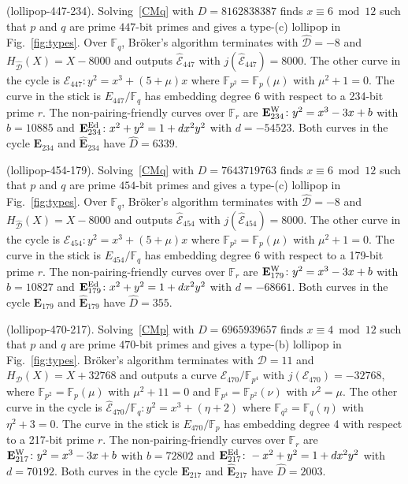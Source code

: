 \documentclass[version=preprint]{iacrcc}
\newcommand{\F}{\mathbb{F}}
\newcommand{\EC}{\mathcal{E}}
\newcommand{\D}{\mathcal{D}}
\begin{document}
\begin{example}(\textsf{lollipop-447-234}). \label{example:447-234} Solving~\eqref{CMq} with $D=8162838387$ finds $x \equiv 6 \bmod{12}$ such that $p$ and $q$ are prime $447$-bit primes and gives a type-(c) lollipop in Fig.~\ref{fig:types}. Over $\F_q$, Br{\"o}ker's algorithm terminates with $\hat{\D}=-8$ and $H_{\hat{\D}}(X)= X -8000$ and outputs $\hat{\EC}_{447}$ with $j(\hat{\EC}_{447}) =8000$. The other curve in the cycle is ${\EC}_{447} \colon y^2=x^3+(5+\mu)x$  where $\F_{p^2}=\F_p(\mu)$ with $\mu^2+1=0$.  The curve in the stick is $E_{447}/\F_q$ has embedding degree 6 with respect to a 234-bit prime $r$. The non-pairing-friendly curves over $\F_r$ are $\mathbf{E}_{234}^{\rm W} \colon y^2=x^3-3x+b$ with $b=10885$ and $\mathbf{E}_{234}^{\rm Ed} \colon x^2+y^2=1+dx^2y^2$ with $d=-54523$. Both curves in the cycle $\mathbf{E}_{234}$ and $\hat{\mathbf{E}}_{234}$ have $\hat{D}=6339$. 
\end{example}

\begin{example}(\textsf{lollipop-454-179}). \label{example:454-179} Solving~\eqref{CMq} with $D=7643719763$ finds $x \equiv 6 \bmod{12}$ such that $p$ and $q$ are prime $454$-bit primes and gives a type-(c) lollipop in Fig.~\ref{fig:types}. Over $\F_q$, Br{\"o}ker's algorithm terminates with $\hat{\D}=-8$ and $H_{\hat{\D}}(X)= X-8000$ and outputs $\hat{\EC}_{454}$ with $j(\hat{\EC}_{454}) =8000$. The other curve in the cycle is ${\EC}_{454} \colon y^2=x^3+(5+\mu)x$  where $\F_{p^2}=\F_p(\mu)$ with $\mu^2+1=0$.  The curve in the stick is $E_{454}/\F_q$ has embedding degree 6 with respect to a 179-bit prime $r$. The non-pairing-friendly curves over $\F_r$ are $\mathbf{E}_{179}^{\rm W} \colon y^2=x^3-3x+b$ with $b=10827$ and $\mathbf{E}_{179}^{\rm Ed} \colon x^2+y^2=1+dx^2y^2$ with $d=-68661$. Both curves in the cycle $\mathbf{E}_{179}$ and $\hat{\mathbf{E}}_{179}$ have $\hat{D}=355$. 
\end{example}

\begin{example}(\textsf{lollipop-470-217}). \label{example:470-217} Solving~\eqref{CMp} with $D=6965939657$ finds $x \equiv 4 \bmod{12}$ such that $p$ and $q$ are prime $470$-bit primes and gives a type-(b) lollipop in Fig.~\ref{fig:types}. Br{\"o}ker's algorithm terminates with $\D=11$ and $H_\D(X)= X + 32768$ and outputs a curve ${\EC}_{470}/\F_{p^4}$ with $j({\EC}_{470})=-32768$, where $\F_{p^2}=\F_p(\mu)$ with $\mu^2+11=0$ and $\F_{p^4}=\F_{p^2}(\nu)$ with $\nu^2=\mu$. The other curve in the cycle is $\hat{\EC}_{470}/\F_q \colon y^2=x^3+(\eta+2)$ where  $\F_{q^2}=\F_q(\eta)$ with $\eta^2+3=0$. The curve in the stick is $E_{470}/\F_p$ has embedding degree 4 with respect to a 217-bit prime $r$. The non-pairing-friendly curves over $\F_r$ are $\mathbf{E}_{217}^{\rm W} \colon y^2=x^3-3x+b$ with $b=72802$ and $\mathbf{E}_{217}^{\rm Ed} \colon -x^2+y^2=1+dx^2y^2$ with $d=70192$. Both curves in the cycle $\mathbf{E}_{217}$ and $\hat{\mathbf{E}}_{217}$ have $\hat{D}=2003$.
\end{example}
\end{document}

